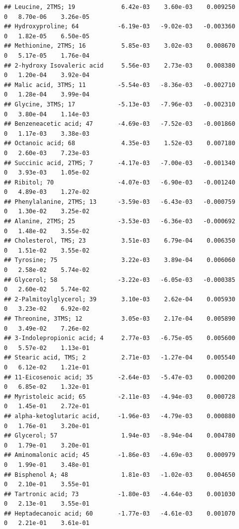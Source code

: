 \documentclass[]{article}
\begin{document}
\begin{verbatim}
## Leucine, 2TMS; 19             6.42e-03    3.60e-03    0.009250         0   8.70e-06    3.26e-05
## Hydroxyproline; 64           -6.19e-03   -9.02e-03   -0.003360         0   1.82e-05    6.50e-05
## Methionine, 2TMS; 16          5.85e-03    3.02e-03    0.008670         0   5.17e-05    1.76e-04
## 2-hydroxy Isovaleric acid     5.56e-03    2.73e-03    0.008380         0   1.20e-04    3.92e-04
## Malic acid, 3TMS; 11         -5.54e-03   -8.36e-03   -0.002710         0   1.28e-04    3.99e-04
## Glycine, 3TMS; 17            -5.13e-03   -7.96e-03   -0.002310         0   3.80e-04    1.14e-03
## Benzeneacetic acid; 47       -4.69e-03   -7.52e-03   -0.001860         0   1.17e-03    3.38e-03
## Octanoic acid; 68             4.35e-03    1.52e-03    0.007180         0   2.60e-03    7.23e-03
## Succinic acid, 2TMS; 7       -4.17e-03   -7.00e-03   -0.001340         0   3.93e-03    1.05e-02
## Ribitol; 70                  -4.07e-03   -6.90e-03   -0.001240         0   4.89e-03    1.27e-02
## Phenylalanine, 2TMS; 13      -3.59e-03   -6.43e-03   -0.000759         0   1.30e-02    3.25e-02
## Alanine, 2TMS; 25            -3.53e-03   -6.36e-03   -0.000692         0   1.48e-02    3.55e-02
## Cholesterol, TMS; 23          3.51e-03    6.79e-04    0.006350         0   1.51e-02    3.55e-02
## Tyrosine; 75                  3.22e-03    3.89e-04    0.006060         0   2.58e-02    5.74e-02
## Glycerol; 58                 -3.22e-03   -6.05e-03   -0.000385         0   2.60e-02    5.74e-02
## 2-Palmitoylglycerol; 39       3.10e-03    2.62e-04    0.005930         0   3.23e-02    6.92e-02
## Threonine, 3TMS; 12           3.05e-03    2.17e-04    0.005890         0   3.49e-02    7.26e-02
## 3-Indolepropionic acid; 4     2.77e-03   -6.75e-05    0.005600         0   5.57e-02    1.13e-01
## Stearic acid, TMS; 2          2.71e-03   -1.27e-04    0.005540         0   6.12e-02    1.21e-01
## 11-Eicosenoic acid; 35       -2.64e-03   -5.47e-03    0.000200         0   6.85e-02    1.32e-01
## Myristoleic acid; 65         -2.11e-03   -4.94e-03    0.000728         0   1.45e-01    2.72e-01
## alpha-ketoglutaric acid,     -1.96e-03   -4.79e-03    0.000880         0   1.76e-01    3.20e-01
## Glycerol; 57                  1.94e-03   -8.94e-04    0.004780         0   1.79e-01    3.20e-01
## Aminomalonic acid; 45        -1.86e-03   -4.69e-03    0.000979         0   1.99e-01    3.48e-01
## Bisphenol A; 48               1.81e-03   -1.02e-03    0.004650         0   2.10e-01    3.55e-01
## Tartronic acid; 73           -1.80e-03   -4.64e-03    0.001030         0   2.13e-01    3.55e-01
## Heptadecanoic acid; 60       -1.77e-03   -4.61e-03    0.001070         0   2.21e-01    3.61e-01

\end{verbatim}
\end{document}

